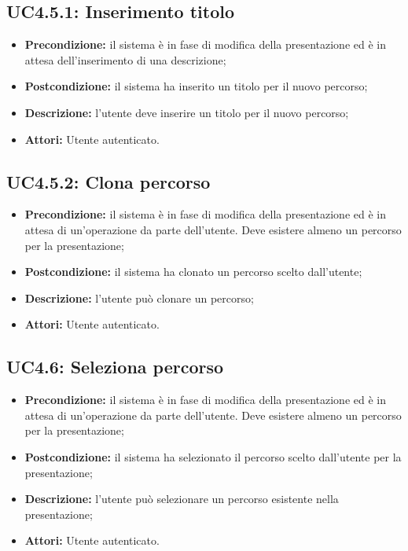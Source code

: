 \subsection{ UC4.5.1: Inserimento titolo}

\begin{itemize}
	\item \textbf{Precondizione:} il sistema è in fase di modifica della presentazione ed è in attesa dell'inserimento di una descrizione;
	\item \textbf{Postcondizione:} il sistema ha inserito un titolo per il nuovo percorso;
	\item \textbf{Descrizione:} l'utente deve inserire un titolo per il nuovo percorso;
	\item \textbf{Attori:} Utente autenticato.
\end{itemize}
\subsection{ UC4.5.2: Clona percorso}

\begin{itemize}
	\item \textbf{Precondizione:} il sistema è in fase di modifica della presentazione ed è in attesa di un'operazione da parte dell'utente. Deve esistere almeno un percorso per la presentazione;
	\item \textbf{Postcondizione:} il sistema ha clonato un percorso scelto dall'utente;
	\item \textbf{Descrizione:} l'utente può clonare un percorso;
	\item \textbf{Attori:} Utente autenticato.
\end{itemize}
\subsection{ UC4.6: Seleziona percorso}

\begin{itemize}
	\item \textbf{Precondizione:} il sistema è in fase di modifica della presentazione ed è in attesa di un'operazione da parte dell'utente. Deve esistere almeno un percorso per la presentazione;
	\item \textbf{Postcondizione:} il sistema ha selezionato il percorso scelto dall'utente per la presentazione;
	\item \textbf{Descrizione:} l'utente può selezionare un percorso esistente nella presentazione;
	\item \textbf{Attori:} Utente autenticato.
\end{itemize}
